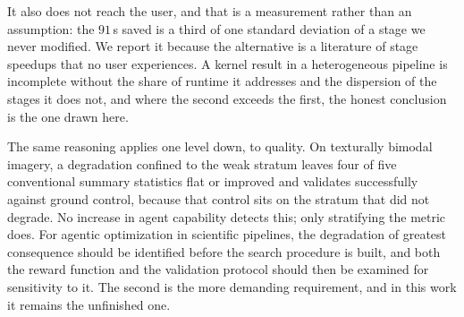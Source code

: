 \documentclass[conference]{IEEEtran}
\begin{document}
It also does not reach the user, and that is a measurement rather than an
assumption: the $91$\,s saved is a third of one standard deviation of a stage we
never modified. We report it because the alternative is a literature of stage
speedups that no user experiences. A kernel result in a heterogeneous pipeline
is incomplete without the share of runtime it addresses and the dispersion of the
stages it does not, and where the second exceeds the first, the honest
conclusion is the one drawn here.

The same reasoning applies one level down, to quality. On texturally bimodal
imagery, a degradation confined to the weak stratum leaves four of five
conventional summary statistics flat or improved and validates successfully
against ground control, because that control sits on the stratum that did not
degrade. No
increase in agent capability detects this; only stratifying the metric does. For
agentic optimization in scientific pipelines, the degradation of greatest
consequence should be identified before the search procedure is built, and both
the reward function and the validation protocol should then be examined for
sensitivity to it. The second is the more demanding requirement, and in this work
it remains the unfinished one.




\end{document}
